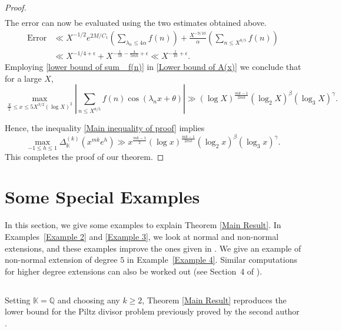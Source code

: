 \documentclass[reqno]{amsart}
\numberwithin{equation}{section}
\theoremstyle{plain}
\begin{document}
\begin{proof}
\begin{align}
\end{align}
The error can now be evaluated using the two estimates obtained above.
\begin{align*}
	\text{Error} &\ll X^{-1/2} e^{2M/C_1} \left(\sum_{\lambda_n\leq 4\alpha}f(n)\right)+ \frac{X^{-9/10}}{\alpha} \left( \sum_{n\leq X^{8/5}}f(n)\right)\\
	&\ll X^{-1/4+\epsilon} + X^{-\frac{1}{10}-\frac{4}{5mk}+\epsilon} \ll X^{-\frac{1}{10} +\epsilon}.
\end{align*}
Employing \eqref{lower bound of sum_ f(n)} in \eqref{Lower bound of A(x)} we conclude that for a large $X$,
\begin{equation*}
\max_{\frac{X}{2}\leq x \leq 5 X^{3/2}(\log X)^2} \left|\sum_{n\leq X^{8/5}}f(n)\cos(\lambda_nx +\theta)\right|\gg (\log X)^{\frac{mk-1}{2mk}} (\log_2 X)^{\beta} (\log_3 X)^{\gamma}.
\end{equation*}

Hence, the inequality \eqref{Main inequality of proof} implies 
\begin{equation*}
	\max_{-1\leq h\leq 1} \Delta_{\mathbb{K}}^{(k)}\left(x^{mk}e^h\right) \gg x^{\frac{mk-1}{2}} (\log x)^{\frac{mk-1}{2mk}} (\log_2 x)^{\beta} (\log_3 x)^{\gamma}.
\end{equation*}
This completes the proof of our theorem.
 \end{proof}








\section{Some Special Examples}
In this section, we give some examples to explain Theorem \ref{Main Result}. In Examples~\ref{Example 2} and \ref{Example 3}, we look at normal and non-normal extensions, and these examples improve the ones given in \cite{GKMN}. We give an example of non-normal extension of degree $5$ in Example~\ref{Example 4}. Similar computations for higher degree extensions can also be worked out (see Section~4 of \cite{GKMN}).
\subsection{} 
Setting $\mathbb{K} = \mathbb{Q}$ and choosing any $k \geq 2$, Theorem \ref{Main Result} reproduces the lower bound for the Piltz divisor problem previously proved by the second author \cite{K. Mahatab}.
% 
\end{document}

